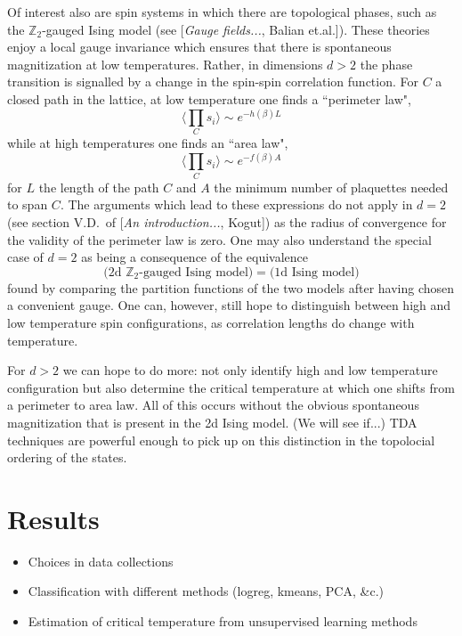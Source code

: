 \documentclass[11pt]{article}
\begin{document}
Of interest also are spin systems in which there are topological phases, such as the $\mathbb{Z}_2$-gauged Ising model (see [\textit{Gauge fields...}, Balian et.al.]). These theories enjoy a local gauge invariance which ensures that there is spontaneous magnitization at low temperatures. Rather, in dimensions $d>2$ the phase transition is signalled by a change in the spin-spin correlation function. For $C$ a closed path in the lattice, at low temperature one finds a ``perimeter law",
\begin{equation}
    \langle\prod_C s_i\rangle \sim e^{-h(\beta)L}
\end{equation}
while at high temperatures one finds an ``area law",
\begin{equation}
    \langle\prod_C s_i\rangle \sim e^{-f(\beta)A}
\end{equation}
for $L$ the length of the path $C$ and $A$ the minimum number of plaquettes needed to span $C$. The arguments which lead to these expressions do not apply in $d=2$ (see section V.D.~of [\textit{An introduction...}, Kogut]) as the radius of convergence for the validity of the perimeter law is zero. One may also understand the special case of $d=2$ as being a consequence of the equivalence
\begin{equation}
    \Big(\text{2d }\mathbb{Z}_2\text{-gauged Ising model}\Big) = \Big( \text{1d Ising model} \Big)
\end{equation}
found by comparing the partition functions of the two models after having chosen a convenient gauge. One can, however, still hope to distinguish between high and low temperature spin configurations, as correlation lengths do change with temperature.

For $d>2$ we can hope to do more: not only identify high and low temperature configuration but also determine the critical temperature at which one shifts from a perimeter to area law. All of this occurs without the obvious spontaneous magnitization that is present in the 2d Ising model. (We will see if...) TDA techniques are powerful enough to pick up on this distinction in the topolocial ordering of the states.


\section{Results}
\begin{itemize}
    \item Choices in data collections
    \item Classification with different methods (logreg, kmeans, PCA, \&c.)
    \item Estimation of critical temperature from unsupervised learning methods
\end{itemize}
\end{document}
